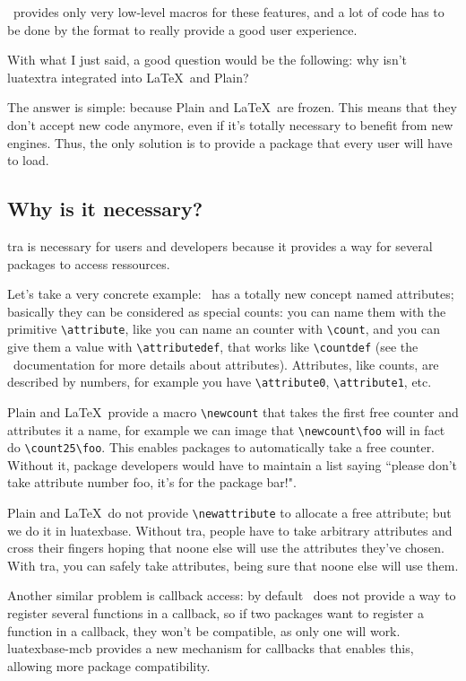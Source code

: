 \documentclass{article}
\newcommand\pf{\textsf}
\begin{document}
\LuaTeX\ provides only very low-level macros for these features, and a lot of
code has to be done by the format to really provide a good user experience.

With what I just said, a good question would be the following: why isn't
\pf{luatextra} integrated into \LaTeX\ and Plain?

The answer is simple: because Plain and \LaTeX\ are frozen. This means that
they don't accept new code anymore, even if it's totally necessary to benefit
from new engines. Thus, the only solution is to provide a package that every
user will have to load.

\subsection{Why is it necessary?}

\LuaTeX tra is necessary for users and developers because it provides a way
for several packages to access ressources.

Let's take a very concrete example: \LuaTeX\ has a totally new concept named
attributes; basically they can be considered as special counts: you can name
them with the primitive \verb+\attribute+, like you can name an
counter with \verb+\count+, and you can give them a value with
\verb+\attributedef+, that works like \verb+\countdef+ (see
the \LuaTeX\ documentation for more details about attributes). Attributes,
like counts, are described by numbers, for example you have
\verb+\attribute0+, \verb+\attribute1+, etc.

Plain and \LaTeX\ provide a macro \verb+\newcount+ that takes the first free
counter and attributes it a name, for example we can image that
\verb+\newcount\foo+ will in fact do \verb+\count25\foo+. This enables
packages to automatically take a free counter. Without it, package developers
would have to maintain a list saying ``please don't take attribute number foo,
it's for the package bar!".

Plain and \LaTeX\ do not provide \verb+\newattribute+ to allocate a
free attribute; but we do it in \pf{luatexbase}. Without \LuaTeX tra,
people have to take arbitrary attributes and cross their fingers hoping that
noone else will use the attributes they've chosen. With \LuaTeX tra, you can
safely take attributes, being sure that noone else will use them.

Another similar problem is callback access: by default \LuaTeX\ does not
provide a way to register several functions in a callback, so if two packages
want to register a function in a callback, they won't be compatible, as only
one will work. \pf{luatexbase-mcb} provides a new mechanism for callbacks
that enables this, allowing more package compatibility.
\end{document}
